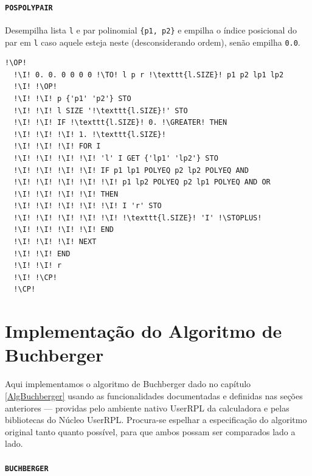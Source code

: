 \documentclass[12pt,a4paper]{report}
\newcommand{\kwd}[1]{\texttt{\textcolor{keyword}{#1}}}
\newcommand{\I}{\enspace\textcolor{indent}\vrule\hspace{2pt}}
\newcommand{\GREATER}{\kwd{$>$}}   %
\newcommand{\STOPLUS}{\kwd{STO+}} %
\newcommand{\POSPOLYPAIR}{\kwd{POSPOLYPAIR}}   %
\newcommand{\BUCHBERGER}{\kwd{BUCHBERGER}}   %
\newcommand{\OP}{\kwd{$\ll$}}   %
\newcommand{\CP}{\kwd{$\gg$}}   %
\newcommand{\TO}{\kwd{$\rightarrow$}} %
\numberwithin{theorem}{chapter}
\begin{document}
\subsubsection{\POSPOLYPAIR}\label{POSPOLYPAIR}
Desempilha lista \texttt{l} e par polinomial \texttt{\{\texttt{p1},
  \texttt{p2}\}} e empilha o índice posicional do par em \texttt{l}
caso aquele esteja neste (desconsiderando ordem), senão empilha
\texttt{0.0}.
\begin{lstlisting}[language=userrpl]
  !\OP!
  !\I! 0. 0. 0 0 0 0 !\TO! l p r !\texttt{l.SIZE}! p1 p2 lp1 lp2
  !\I! !\OP!
  !\I! !\I! p {'p1' 'p2'} STO
  !\I! !\I! l SIZE '!\texttt{l.SIZE}!' STO
  !\I! !\I! IF !\texttt{l.SIZE}! 0. !\GREATER! THEN
  !\I! !\I! !\I! 1. !\texttt{l.SIZE}!
  !\I! !\I! !\I! FOR I
  !\I! !\I! !\I! !\I! 'l' I GET {'lp1' 'lp2'} STO
  !\I! !\I! !\I! !\I! IF p1 lp1 POLYEQ p2 lp2 POLYEQ AND
  !\I! !\I! !\I! !\I! !\I! p1 lp2 POLYEQ p2 lp1 POLYEQ AND OR
  !\I! !\I! !\I! !\I! THEN
  !\I! !\I! !\I! !\I! !\I! I 'r' STO
  !\I! !\I! !\I! !\I! !\I! !\texttt{l.SIZE}! 'I' !\STOPLUS!
  !\I! !\I! !\I! !\I! END
  !\I! !\I! !\I! NEXT
  !\I! !\I! END
  !\I! !\I! r
  !\I! !\CP!
  !\CP!
\end{lstlisting}



\chapter{Implementação do Algoritmo de Buchberger}\label{ImpBuchberger}

Aqui implementamos o algoritmo de Buchberger dado no capítulo
\ref{AlgBuchberger} usando as funcionalidades documentadas e definidas
nas seções anteriores --- providas pelo ambiente nativo UserRPL da
calculadora e pelas bibliotecas do Núcleo UserRPL.  Procura-se
espelhar a especificação do algoritmo original tanto quanto possível,
para que ambos possam ser comparados lado a lado.

\subsubsection{\BUCHBERGER}\label{BUCHBERGER}
\end{document}
